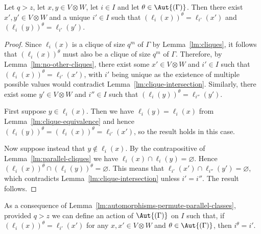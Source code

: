 \begin{lemma} \label{lm:automorphisms-permute-parallel-classes}
Let $q > z$, let $x, y \in V \otimes W$, let $i \in I$ and let $\theta \in \Aut{\left(\Gamma \right)}$. Then there exist $x', y' \in V \otimes W$ and a unique $i' \in I$ such that $\left(\ell_i{\left(x \right)}\right)^\theta = \ell_{i'}{\left(x' \right)}$ and $\left(\ell_i{\left(y \right)}\right)^\theta = \ell_{i'}{\left(y' \right)}$.
\end{lemma}
\begin{proof}
Since $\ell_i{\left(x \right)}$ is a clique of size $q^m$ of $\Gamma$ by Lemma~\ref{lm:cliques}, it follows that $\left(\ell_i{\left(x \right)}\right)^\theta$ must also be a clique of size $q^m$ of $\Gamma$. Therefore, by Lemma~\ref{lm:no-other-cliques}, there exist some $x' \in V \otimes W$ and $i' \in I$ such that $\left(\ell_i{\left(x \right)}\right)^\theta = \ell_{i'}{\left(x' \right)}$, with $i'$ being unique as the existence of multiple possible values would contradict Lemma~\ref{lm:clique-intersection}. Similarly, there exist some $y' \in V \otimes W$ and $i'' \in I$ such that $\left(\ell_i{\left(y \right)}\right)^\theta = \ell_{i''}{\left(y' \right)}$.

First suppose $y \in \ell_i{\left(x \right)}$. Then we have $\ell_i{\left(y \right)} = \ell_i{\left(x \right)}$ from Lemma~\ref{lm:clique-equivalence} and hence $\left(\ell_i{\left(y \right)}\right)^\theta = \left(\ell_i{\left(x \right)}\right)^\theta = \ell_{i'}{\left(x' \right)}$, so the result holds in this case.

Now suppose instead that $y \notin \ell_i{\left(x \right)}$. By the contrapositive of Lemma~\ref{lm:parallel-cliques} we have $\ell_i{\left(x \right)} \cap \ell_i{\left(y \right)} = \varnothing$. Hence $\left(\ell_i{\left(x \right)}\right)^\theta \cap \left(\ell_i{\left(y \right)}\right)^\theta = \varnothing$. This means that $\ell_{i'}{\left(x' \right)} \cap \ell_{i''}{\left(y' \right)} = \varnothing$, which contradicts Lemma~\ref{lm:clique-intersection} unless $i' = i''$. The result follows.
\end{proof}

As a consequence of Lemma~\ref{lm:automorphisms-permute-parallel-classes}, provided $q > z$ we can define an action of $\Aut{\left(\Gamma \right)}$ on $I$ such that, if $\left(\ell_i{\left(x \right)}\right)^\theta = \ell_{i'}{\left(x' \right)}$ for any $x, x' \in V \otimes W$ and $\theta \in \Aut{\left(\Gamma \right)}$, then $i^\theta = i'$.


